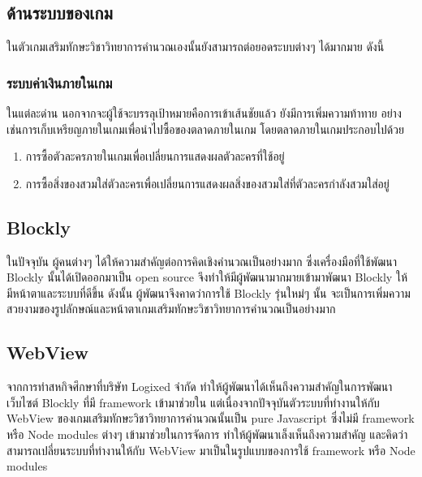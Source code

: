\subsection{ด้านระบบของเกม}
ในตัวเกมเสริมทักษะวิชาวิทยาการคำนวณเองนั้นยังสามารถต่อยอดระบบต่างๆ ได้มากมาย ดังนี้

\subsubsection{ระบบค่าเงินภายในเกม}
ในแต่ละด่าน นอกจากจะผู้ใช้จะบรรลุเป้าหมายคือการเข้าเส้นชัยแล้ว ยังมีการเพิ่มความท้าทาย อย่างเช่นการเก็บเหรียญภายในเกมเพื่อนำไปซื้อของตลาดภายในเกม 
โดยตลาดภายในเกมประกอบไปด้วย
\begin{enumerate}
    \item การซื้อตัวละครภายในเกมเพื่อเปลี่ยนการแสดงผลตัวละครที่ใช้อยู่
    \item การซื้อสิ่งของสวมใส่ตัวละครเพื่อเปลี่ยนการแสดงผลสิ่งของสวมใส่ที่ตัวละครกำลังสวมใส่อยู่
\end{enumerate}

\subsection{Blockly}
ในปัจจุบัน ผู้คนต่างๆ ได้ให้ความสำคัญต่อการคิดเชิงคำนวณเป็นอย่างมาก ซึ่งเครื่องมือที่ใช้พัฒนา Blockly นั้นได้เปิดออกมาเป็น open source
จึงทำให้มีผู้พัฒนามากมายเข้ามาพัฒนา Blockly ให้มีหน้าตาและระบบที่ดีขึ้น ดังนั้น ผู้พัฒนาจึงคาดว่าการใช้ Blockly รุ่นใหม่ๆ นั้น
จะเป็นการเพิ่มความสวยงามของรูปลักษณ์และหน้าตาเกมเสริมทักษะวิชาวิทยาการคำนวณเป็นอย่างมาก

\subsection{WebView}
จากการทำสหกิจศึกษาที่บริษัท Logixed จำกัด ทำให้ผู้พัฒนาได้เห็นถึงความสำคัญในการพัฒนาเว็บไซต์ Blockly ที่มี framework เข้ามาช่วยใน
แต่เนื่องจากปัจจุบันตัวระบบที่ทำงานให้กับ WebView ของเกมเสริมทักษะวิชาวิทยาการคำนวณนั้นเป็น pure Javascript ซึ่งไม่มี framework หรือ Node modules ต่างๆ เข้ามาช่วยในการจัดการ
ทำให้ผู้พัฒนาเล็งเห็นถึงความสำคัญ และคิดว่าสามารถเปลี่ยนระบบที่ทำงานให้กับ WebView มาเป็นในรูปแบบของการใช้ framework หรือ Node modules

